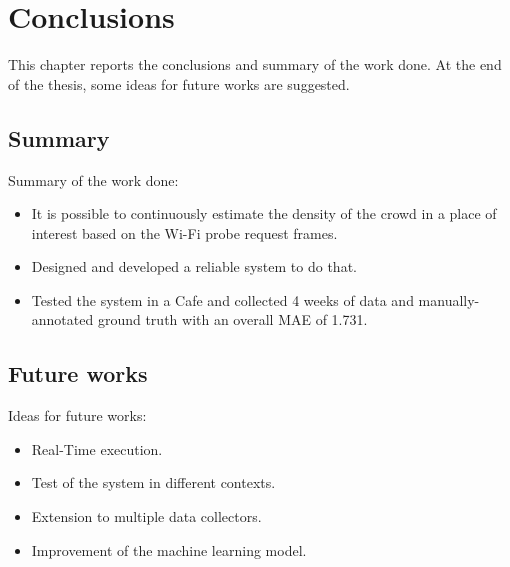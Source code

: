 \chapter{Conclusions}
\label{cha:conclusions}
\vspace{0.4 cm} 

This chapter reports the conclusions and summary of the work done. At the end of the thesis, some ideas for future works are suggested.


\section{Summary}
\label{sec:future}
\vspace{0.2 cm} 

Summary of the work done:
\begin{itemize}
  \item It is possible to continuously estimate the density of the crowd in a place of interest based on the Wi-Fi probe request frames.
  \item Designed and developed a reliable system to do that.
  \item Tested the system in a Cafe and collected 4 weeks of data and manually-annotated ground truth with an overall MAE of 1.731.
\end{itemize}


\section{Future works}
\label{sec:future}
\vspace{0.2 cm} 

Ideas for future works:
\begin{itemize}
  \item Real-Time execution.
  \item Test of the system in different contexts.
  \item Extension to multiple data collectors.
  \item Improvement of the machine learning model.
\end{itemize}
